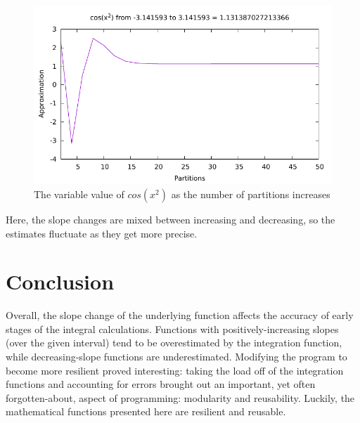\documentclass[12pt]{article}
\begin{document}
\begin{figure}\begin{centering}
\includegraphics{integrate4.pdf}\caption{The variable value of $cos(x^2)$ as the number of partitions increases}
\end{centering}\end{figure}
Here, the slope changes are mixed between increasing and decreasing, so the estimates fluctuate as they get more precise.

\section{Conclusion}

Overall, the slope change of the underlying function affects the accuracy of early stages of the integral calculations. Functions with positively-increasing slopes (over the given interval) tend to be overestimated by the integration function, while decreasing-slope functions are underestimated. Modifying the program to become more resilient proved interesting: taking the load off of the integration functions and accounting for errors brought out an important, yet often forgotten-about, aspect of programming: modularity and reusability. Luckily, the mathematical functions presented here are resilient and reusable.
\end{document}
